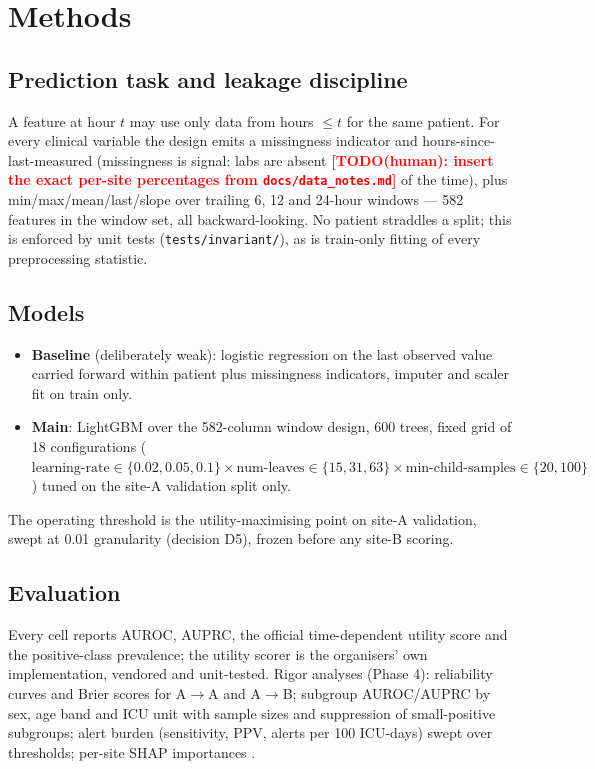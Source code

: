 \documentclass[11pt,a4paper]{article}
\newcommand{\todohuman}[1]{\textcolor{red}{\textbf{[TODO(human): #1]}}}
\begin{document}
\section{Methods}
\subsection{Prediction task and leakage discipline}
A feature at hour $t$ may use only data from hours $\le t$ for the same
patient. For every clinical variable the design emits a missingness indicator
and hours-since-last-measured (missingness is signal: labs are absent
\todohuman{insert the exact per-site percentages from
\texttt{docs/data\_notes.md}} of the time), plus min/max/mean/last/slope over
trailing 6, 12 and 24-hour windows --- 582 features in the window set, all
backward-looking. No patient straddles a split; this is enforced by unit tests
(\texttt{tests/invariant/}), as is train-only fitting of every preprocessing
statistic.

\subsection{Models}
\begin{itemize}
\item \textbf{Baseline} (deliberately weak): logistic regression on the last
observed value carried forward within patient plus missingness indicators,
imputer and scaler fit on train only.
\item \textbf{Main}: LightGBM \citep{lightgbm} over the 582-column window
design, 600 trees, fixed grid of 18 configurations
($\text{learning-rate}\in\{0.02,0.05,0.1\}\times
\text{num-leaves}\in\{15,31,63\}\times
\text{min-child-samples}\in\{20,100\}$) tuned on the site-A validation split
only.
\end{itemize}
The operating threshold is the utility-maximising point on site-A validation,
swept at 0.01 granularity (decision D5), frozen before any site-B scoring.

\subsection{Evaluation}
Every cell reports AUROC, AUPRC, the official time-dependent utility score
\citep{reyna2019} and the positive-class prevalence; the utility scorer is the
organisers' own implementation, vendored and unit-tested. Rigor analyses
(Phase 4): reliability curves and Brier scores for A$\to$A and A$\to$B;
subgroup AUROC/AUPRC by sex, age band and ICU unit with sample sizes and
suppression of small-positive subgroups; alert burden (sensitivity, PPV, alerts
per 100 ICU-days) swept over thresholds; per-site SHAP importances
\citep{shap}.
\end{document}
